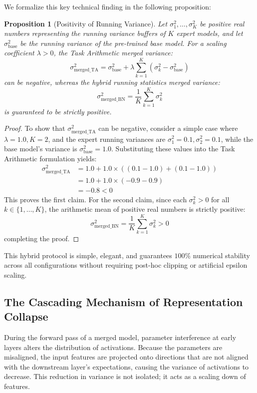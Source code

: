 \documentclass{article}
\theoremstyle{plain}
\newtheorem{proposition}[theorem]{Proposition}
\theoremstyle{definition}
\theoremstyle{remark}
\begin{document}
We formalize this key technical finding in the following proposition:

\begin{proposition}[Positivity of Running Variance]
Let $\sigma^2_1, \dots, \sigma^2_K$ be positive real numbers representing the running variance buffers of $K$ expert models, and let $\sigma^2_{\text{base}}$ be the running variance of the pre-trained base model. For a scaling coefficient $\lambda > 0$, the Task Arithmetic merged variance:
\begin{equation}
\sigma^2_{\text{merged\_TA}} = \sigma^2_{\text{base}} + \lambda \sum_{k=1}^K (\sigma^2_k - \sigma^2_{\text{base}})
\end{equation}
can be negative, whereas the hybrid running statistics merged variance:
\begin{equation}
\sigma^2_{\text{merged\_BN}} = \frac{1}{K} \sum_{k=1}^K \sigma^2_k
\end{equation}
is guaranteed to be strictly positive.
\end{proposition}

\begin{proof}
To show that $\sigma^2_{\text{merged\_TA}}$ can be negative, consider a simple case where $\lambda = 1.0, K = 2$, and the expert running variances are $\sigma^2_1 = 0.1, \sigma^2_2 = 0.1$, while the base model's variance is $\sigma^2_{\text{base}} = 1.0$. Substituting these values into the Task Arithmetic formulation yields:
\begin{align*}
\sigma^2_{\text{merged\_TA}} &= 1.0 + 1.0 \times \left( (0.1 - 1.0) + (0.1 - 1.0) \right) \\
&= 1.0 + 1.0 \times (-0.9 - 0.9) \\
&= -0.8 < 0
\end{align*}
This proves the first claim. For the second claim, since each $\sigma^2_k > 0$ for all $k \in \{1, \dots, K\}$, the arithmetic mean of positive real numbers is strictly positive:
\begin{equation}
\sigma^2_{\text{merged\_BN}} = \frac{1}{K} \sum_{k=1}^K \sigma^2_k > 0
\end{equation}
completing the proof.
\end{proof}

This hybrid protocol is simple, elegant, and guarantees $100\%$ numerical stability across all configurations without requiring post-hoc clipping or artificial epsilon scaling.

\subsection{The Cascading Mechanism of Representation Collapse}
During the forward pass of a merged model, parameter interference at early layers alters the distribution of activations. Because the parameters are misaligned, the input features are projected onto directions that are not aligned with the downstream layer's expectations, causing the variance of activations to decrease. This reduction in variance is not isolated; it acts as a scaling down of features. 
\end{document}
